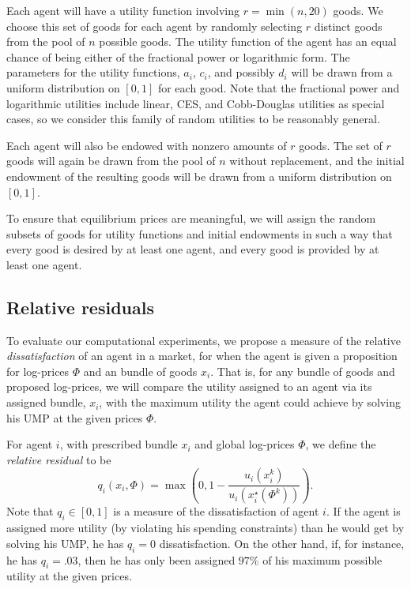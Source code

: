 \documentclass[12pt]{article}
\begin{document}
Each agent will have a utility function involving $r = \min(n,20)$ goods. We
choose this set of goods for each agent by randomly selecting $r$ distinct
goods from the pool of $n$ possible goods. The utility function of the agent
has an equal chance of  being either of the fractional power or logarithmic
form. The parameters for the utility functions, $a_i$, $c_i$, and possibly
$d_i$ will be drawn from a uniform distribution on $[0,1]$ for each good. Note
that the fractional power and logarithmic utilities include linear, CES, and
Cobb-Douglas utilities as special cases, so we consider this family of random
utilities to be reasonably general.

Each agent will also be endowed with nonzero amounts of $r$ goods. The set of
$r$ goods will again be drawn from the pool of $n$ without replacement, and the
initial endowment of the resulting goods will be drawn from a uniform
distribution on $[0,1]$.

To ensure that equilibrium prices are meaningful, we will assign the random
subsets of goods for utility functions and initial endowments in such a way
that every good is desired by at least one agent, and every good is provided by
at least one agent.

\subsection{Relative residuals}

To evaluate our computational experiments, we propose a measure of the relative
\emph{dissatisfaction} of an agent in a market, for when the agent is given a
proposition for log-prices $\Phi$ and an bundle of goods $x_i$. That is, for
any bundle of goods and proposed log-prices, we will compare the utility
assigned to an agent via its assigned bundle, $x_i$, with the maximum utility
the agent could achieve by solving his UMP at the given prices $\Phi$.

For agent $i$, with prescribed bundle $x_i$ and global log-prices $\Phi$,
we define the \emph{relative residual} to be
\[
q_i(x_i, \Phi)= \max\left(0,1-\frac{u_i(x_i^k)}{u_i(x_i^\star(\Phi^k))}\right).
\]
Note that $q_i \in [0,1]$ is a measure of the dissatisfaction of agent $i$. If
the agent is assigned more utility (by violating his spending constraints) than
he would get by solving his UMP, he has $q_i = 0$ dissatisfaction. On the other
hand, if, for instance, he has $q_i = .03$, then he has only been assigned
$97\%$ of his maximum possible utility at the given prices.
\end{document}
